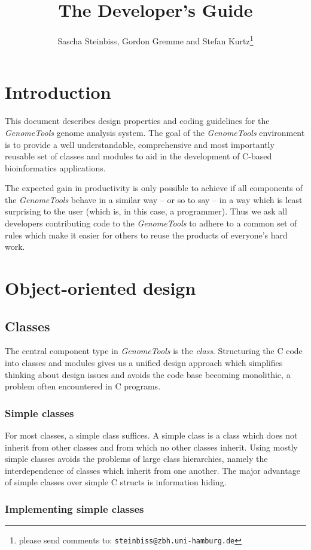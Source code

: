 \documentclass[11pt,final]{article}
\title{The \Gt Developer's Guide}
\author{Sascha Steinbiss, Gordon Gremme and Stefan
        Kurtz\thanks{please send comments to:
        \texttt{steinbiss@zbh.uni-hamburg.de}}}
\newcommand{\Gt}[0]{\emph{GenomeTools}\xspace}
\begin{document}
\maketitle
\tableofcontents


\section{Introduction}
This document describes design properties and coding guidelines for the \Gt
genome analysis system. The goal of the \Gt environment is to provide a
well understandable, comprehensive and most importantly reusable set of classes
and modules to aid in the development of C-based bioinformatics applications.

The expected gain in productivity is only possible to achieve if all
components of the \Gt behave in a similar way -- or so to say -- in a way which
is least surprising to the user (which is, in this case, a programmer).
Thus we ask all developers contributing code to the \Gt to adhere to a common
set of rules which make it easier for others to reuse the products of
everyone's hard work.


\section{Object-oriented design}
\subsection{Classes}

The central component type in \Gt is the \emph{class}. Structuring the C code
into classes and modules gives us a unified design approach which simplifies
thinking about design issues and avoids the code base becoming monolithic, a
problem often encountered in C programs.

\subsubsection{Simple classes}

For most classes, a simple class suffices. A simple class is a class which does
not inherit from other classes and from which no other classes inherit. Using
mostly simple classes avoids the problems of large class hierarchies, namely
the interdependence of classes which inherit from one another. The major
advantage of simple classes over simple C structs is information hiding.

\subsubsection{Implementing simple classes}
\label {simpleclasses}
\end{document}
